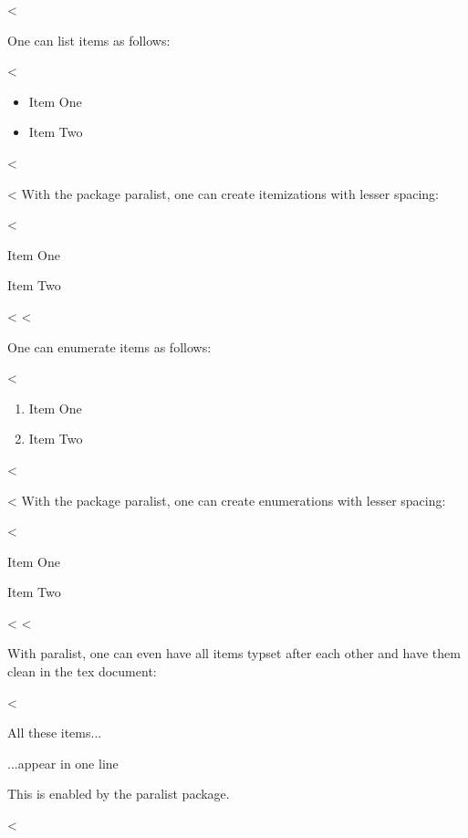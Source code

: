<%

One can list items as follows:

<%
\begin{itemize}
\item Item One
\item Item Two
\end{itemize}
<%

<%
With the package paralist, one can create itemizations with lesser spacing:

<%
\begin{compactitem}
\item Item One
\item Item Two
\end{compactitem}
<%
<%

One can enumerate items as follows:

<%
\begin{enumerate}
  \item Item One
  \item Item Two
\end{enumerate}
<%

<%
With the package paralist, one can create enumerations with lesser spacing:

<%
\begin{compactenum}
  \item Item One
  \item Item Two
\end{compactenum}
<%
<%

With paralist, one can even have all items typset after each other and have them clean in the tex document:

<%
\begin{inparaenum}
  \item All these items...
  \item ...appear in one line
  \item This is enabled by the paralist package.
\end{inparaenum}
<%
